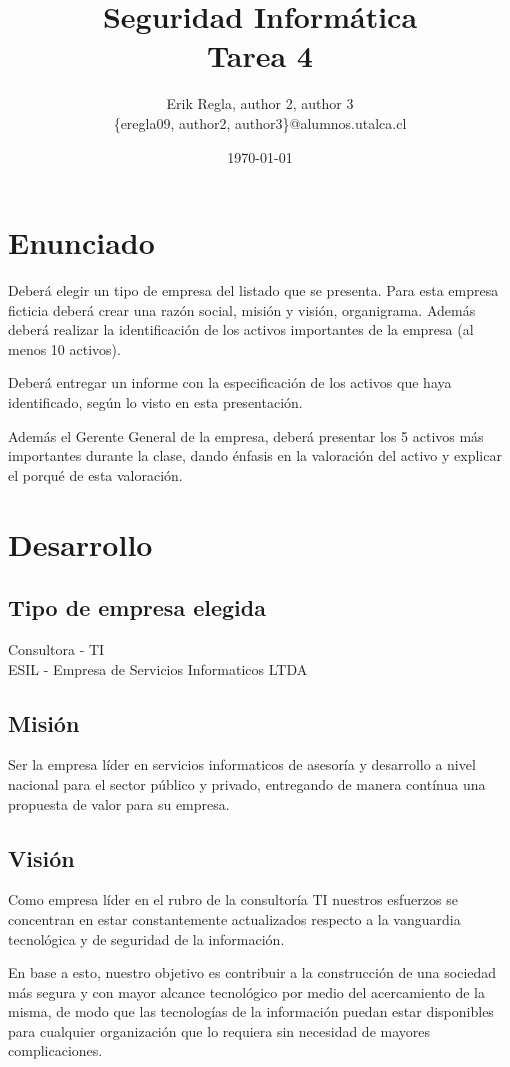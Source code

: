 \documentclass[11pt]{utalcaDoc}
\title{{\bf Seguridad Informática}\\ Tarea 4}
\author{Erik Regla, author 2, author 3\\ 
\{eregla09, author2, author3\}@alumnos.utalca.cl}
\date{\today}
\begin{document}
\maketitle

\section{Enunciado}
Deberá elegir un tipo de empresa del listado que se presenta. Para
esta empresa ficticia deberá crear una razón social, misión y visión,
organigrama. Además deberá realizar la identificación de los activos
importantes de la empresa (al menos 10 activos).

Deberá entregar un informe con la especificación de los activos que
haya identificado, según lo visto en esta presentación.

Además el Gerente General de la empresa, deberá presentar
los 5 activos más importantes durante la clase, dando énfasis
en la valoración del activo y explicar el porqué de esta
valoración.

\section{Desarrollo}

\subsection{Tipo de empresa elegida}
Consultora - TI\\
ESIL - Empresa de Servicios Informaticos LTDA

\subsection{Misión}
Ser la empresa líder en servicios informaticos de asesoría y desarrollo a nivel nacional para el sector público y privado, entregando de manera contínua una propuesta de valor para su empresa.

\subsection{Visión}
Como empresa líder en el rubro de la consultoría TI nuestros esfuerzos se concentran en estar constantemente actualizados respecto a la vanguardia tecnológica y de seguridad de la información.

En base a esto, nuestro objetivo es contribuir a la construcción de una sociedad más segura y con mayor alcance tecnológico por medio del acercamiento de la misma, de modo que las tecnologías de la información puedan estar disponibles para cualquier organización que lo requiera sin necesidad de mayores complicaciones.
\end{document}
